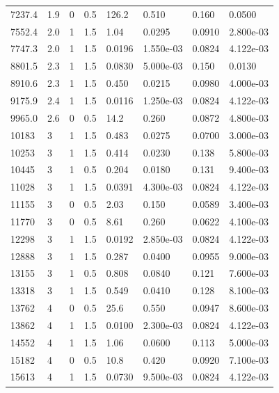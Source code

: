 \documentclass[preview]{standalone}
\begin{document}
{{\begin{tabular}{L{1.2cm}C{1.2cm} C{0.3cm}C{0.5cm} C{1.4cm}C{1.4cm} C{1.4cm}C{1.4cm}}
  7237.4  &   1.9  & 0     & 0.5 &  126.2  & 0.510  & 0.160 &  0.0500   \\ 
  7552.4  &   2.0  & 1     & 1.5 &  1.04  & 0.0295  & 0.0910 &  2.800e-03   \\ 
  7747.3  &   2.0  & 1     & 1.5 &  0.0196  & 1.550e-03  & 0.0824 &  4.122e-03   \\ 
  8801.5  &   2.3  & 1     & 1.5 &  0.0830  & 5.000e-03  & 0.150 &  0.0130   \\ 
  8910.6  &   2.3  & 1     & 1.5 &  0.450  & 0.0215  & 0.0980 &  4.000e-03   \\ 
  9175.9  &   2.4  & 1     & 1.5 &  0.0116  & 1.250e-03  & 0.0824 &  4.122e-03   \\ 
  9965.0  &   2.6  & 0     & 0.5 &  14.2  & 0.260  & 0.0872 &  4.800e-03   \\ 
  10183  &     3  & 1     & 1.5 &  0.483  & 0.0275  & 0.0700 &  3.000e-03   \\ 
  10253  &     3  & 1     & 1.5 &  0.414  & 0.0230  & 0.138 &  5.800e-03   \\ 
  10445  &     3  & 1     & 0.5 &  0.204  & 0.0180  & 0.131 &  9.400e-03   \\ 
  11028  &     3  & 1     & 1.5 &  0.0391  & 4.300e-03  & 0.0824 &  4.122e-03   \\ 
  11155  &     3  & 0     & 0.5 &  2.03  & 0.150  & 0.0589 &  3.400e-03   \\ 
  11770  &     3  & 0     & 0.5 &  8.61  & 0.260  & 0.0622 &  4.100e-03   \\ 
  12298  &     3  & 1     & 1.5 &  0.0192  & 2.850e-03  & 0.0824 &  4.122e-03   \\ 
  12888  &     3  & 1     & 1.5 &  0.287  & 0.0400  & 0.0955 &  9.000e-03   \\ 
  13155  &     3  & 1     & 0.5 &  0.808  & 0.0840  & 0.121 &  7.600e-03   \\ 
  13318  &     3  & 1     & 1.5 &  0.549  & 0.0410  & 0.128 &  8.100e-03   \\ 
  13762  &     4  & 0     & 0.5 &  25.6  & 0.550  & 0.0947 &  8.600e-03   \\ 
  13862  &     4  & 1     & 1.5 &  0.0100  & 2.300e-03  & 0.0824 &  4.122e-03   \\ 
  14552  &     4  & 1     & 1.5 &  1.06  & 0.0600  & 0.113 &  5.000e-03   \\ 
  15182  &     4  & 0     & 0.5 &  10.8  & 0.420  & 0.0920 &  7.100e-03   \\ 
  15613  &     4  & 1     & 1.5 &  0.0730  & 9.500e-03  & 0.0824 &  4.122e-03   \\ 

\end{tabular}}}
\end{document}
